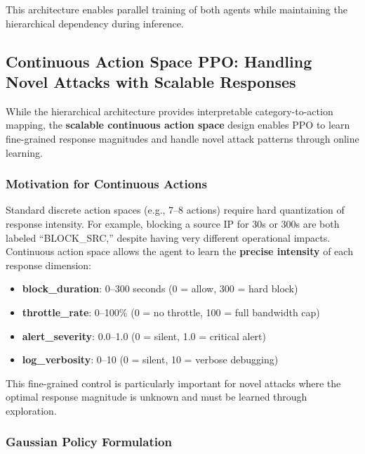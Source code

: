 \documentclass[conference]{IEEEtran}
\begin{document}
This architecture enables parallel training of both agents while maintaining the hierarchical dependency during inference.

\subsection{Continuous Action Space PPO: Handling Novel Attacks with Scalable Responses}

While the hierarchical architecture provides interpretable category-to-action mapping, the \textbf{scalable continuous action space} design enables PPO to learn fine-grained response magnitudes and handle novel attack patterns through online learning.

\subsubsection{Motivation for Continuous Actions}

Standard discrete action spaces (e.g., 7--8 actions) require hard quantization of response intensity. For example, blocking a source IP for 30s or 300s are both labeled ``BLOCK\_SRC,'' despite having very different operational impacts. Continuous action space allows the agent to learn the \textbf{precise intensity} of each response dimension:

\begin{itemize}
    \item \textbf{block\_duration}: 0--300 seconds (0 = allow, 300 = hard block)
    \item \textbf{throttle\_rate}: 0--100\% (0 = no throttle, 100 = full bandwidth cap)
    \item \textbf{alert\_severity}: 0.0--1.0 (0 = silent, 1.0 = critical alert)
    \item \textbf{log\_verbosity}: 0--10 (0 = silent, 10 = verbose debugging)
\end{itemize}

This fine-grained control is particularly important for novel attacks where the optimal response magnitude is unknown and must be learned through exploration.

\subsubsection{Gaussian Policy Formulation}
\end{document}
